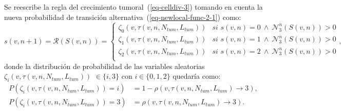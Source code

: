 Se reescribe la regla del crecimiento tumoral~(\ref{eq-celldiv-3}) tomando en cuenta la nueva probabilidad de transici\'on alternativa~(\ref{eq-newlocal-func-2-1}) como:
\begin{equation}
s(v,n+1)=\mathcal{R}(S(v,n))=\left\lbrace
	\begin{array}{ll}
		\zeta_0(v,\tau(v,n,N_{tum},L_{tum}))& \textit{si } s(v,n)=0~\wedge~\mathcal{N}_3^n(S(v,n)) > 0\\
		\zeta_1(v,\tau(v,n,N_{tum},L_{tum}))& \textit{si } s(v,n)=1~\wedge~\mathcal{N}_3^n(S(v,n)) > 0\\
		\zeta_2(v,\tau(v,n,N_{tum},L_{tum}))& \textit{si } s(v,n)=2~\wedge~\mathcal{N}_3^n(S(v,n)) > 0 \\
	\end{array}
\right., \label{eq-celldiv-3-1}
\end{equation}
donde la distribuci\'on de probabilidad de las variables aleatorias $\zeta_i(v,\tau(v,n,N_{tum},L_{tum}))$ $\in \lbrace i,3 \rbrace$ con $i \in \lbrace 0,1,2 \rbrace$ quedar\'ia como:
\begin{subequations}
\begin{align}
P(\zeta_i(v,\tau(v,n,N_{tum},L_{tum}))=i) &= 1 - \rho(v,\tau(v,n,N_{tum},L_{tum}) \rightarrow 3),\\
P(\zeta_i(v,\tau(v,n,N_{tum},L_{tum}))=3) &= \rho(v,\tau(v,n,N_{tum},L_{tum}) \rightarrow 3).
\end{align}
\end{subequations}

